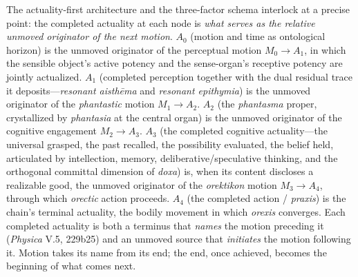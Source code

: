 \documentclass{article}
\begin{document}
The actuality-first architecture and the three-factor schema interlock at a precise point: the completed actuality at each node is \textit{what serves as the relative unmoved originator of the next motion}. $A_0$ (motion and time as ontological horizon) is the unmoved originator of the perceptual motion $M_0 \rightarrow A_1$, in which the sensible object's active potency and the sense-organ's receptive potency are jointly actualized. $A_1$ (completed perception together with the dual residual trace it deposits---\textit{resonant aisthēma} and \textit{resonant epithymia}) is the unmoved originator of the \textit{phantastic} motion $M_1 \rightarrow A_2$. $A_2$ (the \textit{phantasma} proper, crystallized by \textit{phantasia} at the central organ) is the unmoved originator of the cognitive engagement $M_2 \rightarrow A_3$. $A_3$ (the completed cognitive actuality---the universal grasped, the past recalled, the possibility evaluated, the belief held, articulated by intellection, memory, deliberative/speculative thinking, and the orthogonal committal dimension of \textit{doxa}) is, when its content discloses a realizable good, the unmoved originator of the \textit{orektikon} motion $M_3 \rightarrow A_4$, through which \textit{orectic} action proceeds. $A_4$ (the completed action / \textit{praxis}) is the chain's terminal actuality, the bodily movement in which \textit{orexis} converges. Each completed actuality is both a terminus that \textit{names} the motion preceding it (\textit{Physica} V.5, 229b25) and an unmoved source that \textit{initiates} the motion following it. Motion takes its name from its end; the end, once achieved, becomes the beginning of what comes next. 
\end{document}
